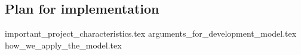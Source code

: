 \subsection{Plan for implementation}

{important_project_characteristics.tex}
{arguments_for_development_model.tex}
{how_we_apply_the_model.tex}